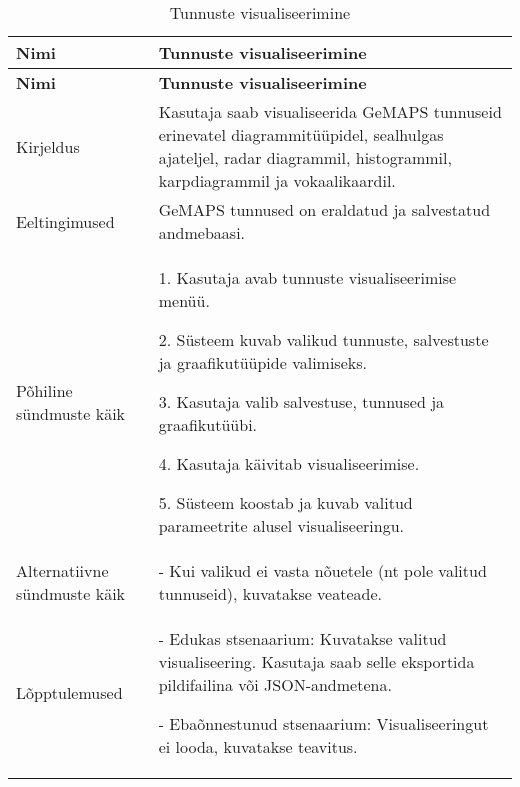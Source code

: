 \begin{longtable}{|p{2.5cm}|p{11cm}|}
    \caption{{Tunnuste visualiseerimine}}
    \label{tab:kasutusjuht3}\\ \hline
    \textbf{Nimi} &  \textbf{Tunnuste visualiseerimine}  \\
    \hline
    \endfirsthead
    \hline
    \textbf{Nimi} &  \textbf{Tunnuste visualiseerimine}  \\
    \hline
    \endhead
    \endfoot
    \hline
    \endlastfoot
    Kirjeldus & Kasutaja saab visualiseerida GeMAPS tunnuseid erinevatel diagrammitüüpidel, sealhulgas ajateljel, radar diagrammil, histogrammil, karpdiagrammil ja vokaalikaardil.\\ \hline
    Eeltingimused & GeMAPS tunnused on eraldatud ja salvestatud andmebaasi.\\ \hline
    Põhiline sündmuste käik & 
    1. Kasutaja avab tunnuste visualiseerimise menüü.
    
    2. Süsteem kuvab valikud tunnuste, salvestuste ja graafikutüüpide valimiseks.
    
    3. Kasutaja valib salvestuse, tunnused ja graafikutüübi.
    
    4. Kasutaja käivitab visualiseerimise.
    
    5. Süsteem koostab ja kuvab valitud parameetrite alusel visualiseeringu.
    \\ \hline
    Alternatiivne sündmuste käik & 
    - Kui valikud ei vasta nõuetele (nt pole valitud tunnuseid), kuvatakse veateade.
    \\ \hline
    Lõpptulemused & 
    - Edukas stsenaarium: Kuvatakse valitud visualiseering. Kasutaja saab selle eksportida pildifailina või JSON-andmetena.
    
    - Ebaõnnestunud stsenaarium: Visualiseeringut ei looda, kuvatakse teavitus.
    \\ \hline
\end{longtable}


